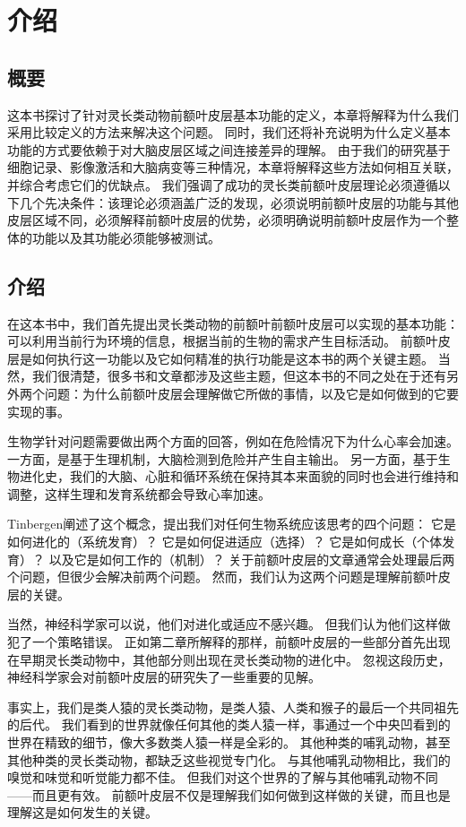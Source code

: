 

\chapter{介绍} \label{chap:chap1}
\section{概要}
这本书探讨了针对灵长类动物前额叶皮层基本功能的定义，本章将解释为什么我们采用比较定义的方法来解决这个问题。
同时，我们还将补充说明为什么定义基本功能的方式要依赖于对大脑皮层区域之间连接差异的理解。
由于我们的研究基于细胞记录、影像激活和大脑病变等三种情况，本章将解释这些方法如何相互关联，并综合考虑它们的优缺点。
我们强调了成功的灵长类前额叶皮层理论必须遵循以下几个先决条件：该理论必须涵盖广泛的发现，必须说明前额叶皮层的功能与其他皮层区域不同，必须解释前额叶皮层的优势，必须明确说明前额叶皮层作为一个整体的功能以及其功能必须能够被测试。


\section{介绍}
在这本书中，我们首先提出灵长类动物的前额叶前额叶皮层可以实现的基本功能：可以利用当前行为环境的信息，根据当前的生物的需求产生目标活动。
前额叶皮层是如何执行这一功能以及它如何精准的执行功能是这本书的两个关键主题。
当然，我们很清楚，很多书和文章都涉及这些主题，但这本书的不同之处在于还有另外两个问题：为什么前额叶皮层会理解做它所做的事情，以及它是如何做到的它要实现的事。
\par 


生物学针对问题需要做出两个方面的回答，例如在危险情况下为什么心率会加速。
一方面，是基于生理机制，大脑检测到危险并产生自主输出。
另一方面，基于生物进化史，我们的大脑、心脏和循环系统在保持其本来面貌的同时也会进行维持和调整，这样生理和发育系统都会导致心率加速。


\par 
Tinbergen阐述了这个概念\cite{tinbergen2020study}，提出我们对任何生物系统应该思考的四个问题：
它是如何进化的（系统发育）？
它是如何促进适应（选择）？
它是如何成长（个体发育）？
以及它是如何工作的（机制）？
关于前额叶皮层的文章通常会处理最后两个问题，但很少会解决前两个问题。
然而，我们认为这两个问题是理解前额叶皮层的关键。
\par 
当然，神经科学家可以说，他们对进化或适应不感兴趣。
但我们认为他们这样做犯了一个策略错误。
正如第二章所解释的那样，前额叶皮层的一些部分首先出现在早期灵长类动物中，其他部分则出现在灵长类动物的进化中。
忽视这段历史，神经科学家会对前额叶皮层的研究失了一些重要的见解。
\par 
事实上，我们是类人猿的灵长类动物，是类人猿、人类和猴子的最后一个共同祖先的后代。
我们看到的世界就像任何其他的类人猿一样，事通过一个中央凹看到的世界在精致的细节，像大多数类人猿一样是全彩的。
其他种类的哺乳动物，甚至其他种类的灵长类动物，都缺乏这些视觉专门化。
与其他哺乳动物相比，我们的嗅觉和味觉和听觉能力都不佳。
但我们对这个世界的了解与其他哺乳动物不同——而且更有效。
前额叶皮层不仅是理解我们如何做到这样做的关键，而且也是理解这是如何发生的关键。

